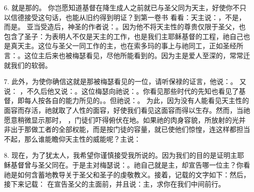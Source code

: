 6. 就是那的。 你岂愿知道基督在降生成人之前就已与圣父同为天主，好使你不只以信德接受这句话，也能从旧约得到明证？到第一卷书  看看：天主说：，不是，而是。 亚当受造后，神圣的作者说：。因为他不将天主性的尊贵仅限于圣父，也包含了圣子：为表明人不仅是天主的工作，也是我们主耶稣基督的工程，祂自己也是真天主。这位与圣父一同工作的主，也在索多玛的事上与祂同工，正如圣经所言：。这位主后来也被梅瑟看见，尽他所能看到的。因为主是爱人至深的，常常迁就我们的软弱。\par

7. 此外，为使你确信这就是那被梅瑟看见的一位，请听保禄的证言，他说：。 又说： ，不久后他又说：。这位梅瑟向祂说：。你看见那些时代的先知也看见了基督，即每人按各自的能力所见的。。但祂说：。 为此，因为没有人能看见天主性的面容而存活，祂就取了人性的面容，好使我们看见这面容而得以生存。然而，当祂愿意稍微显示那时， ，门徒们吓得俯伏在地。如果祂的肉身容貌，所放射的光并非出于那做工者的全部权能，而是按门徒的容量，就已使他们惊惶，连这样都担当不起，那么谁能瞻仰天主性的威能呢？主说：\par

8. 现在，为了犹太人，我希望你谨慎接受我所说的。因为我们的目的是证明主耶稣基督曾与圣父同在。于是主对梅瑟说：。祂自己就是主，却宣告哪一位主？你看祂是如何含蓄地教导关于圣父和圣子的虔敬教义。接着，记载的文字如下：然后，接下来记载：  在宣告圣父的主面前，并且说：主，求你在我们中间前行。\par


